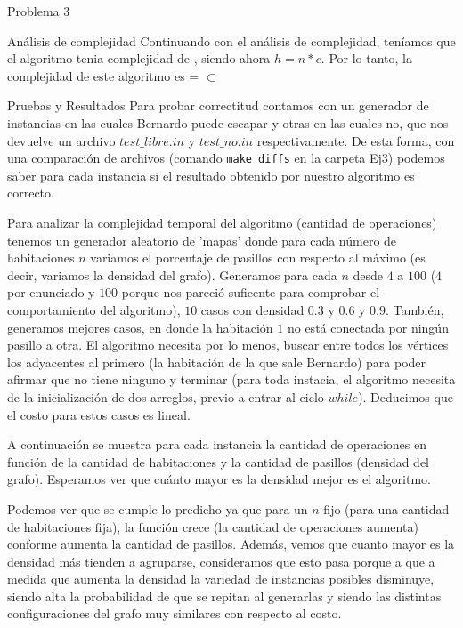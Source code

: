 \begin{section}{Problema 3}
\begin{subsection}{Análisis de complejidad}
		Continuando con el análisis de complejidad, teníamos que el algoritmo tenia complejidad de , siendo ahora $h=n*c$. Por lo tanto, la complejidad de este algoritmo es  =  $\subset$ \\
	\end{subsection}


	\begin{subsection}{Pruebas y Resultados}
		Para probar correctitud contamos con un generador de instancias en las cuales Bernardo puede escapar y otras en las cuales no, que nos devuelve un archivo $test\_libre.in$ y $test\_no.in$ respectivamente. De esta forma, con una comparación de archivos (comando \texttt{make diffs} en la carpeta Ej3) podemos saber para cada instancia si el resultado obtenido por nuestro algoritmo es correcto.

		Para analizar la complejidad temporal del algoritmo (cantidad de operaciones) tenemos un generador aleatorio de 'mapas' donde para cada número de habitaciones $n$ variamos el porcentaje de pasillos con respecto al máximo (es decir, variamos la densidad del grafo). Generamos para cada $n$ desde $4$ a $100$ ($4$ por enunciado y $100$ porque nos pareció suficente para comprobar el comportamiento del algoritmo), $10$ casos con densidad $0.3$ y $0.6$ y $0.9$. También, generamos mejores casos, en donde la habitación $1$ no está conectada por ningún pasillo a otra. El algoritmo necesita por lo menos, buscar entre todos los vértices los adyacentes al primero (la habitación de la que sale Bernardo) para poder afirmar que no tiene ninguno y terminar (para toda instacia, el algoritmo necesita de la inicialización de dos arreglos, previo a entrar al ciclo $while$). Deducimos que el costo para estos casos es lineal.

		A continuación se muestra para cada instancia la cantidad de operaciones en función de la cantidad de habitaciones y la cantidad de pasillos (densidad del grafo). Esperamos ver que cuánto mayor es la densidad mejor es el algoritmo.
		

		Podemos ver que se cumple lo predicho ya que para un $n$ fijo (para una cantidad de habitaciones fija), la función crece (la cantidad de operaciones aumenta) conforme aumenta la cantidad de pasillos. 
		Además, vemos que cuanto mayor es la densidad más tienden a agruparse, consideramos que esto pasa porque a que a medida que aumenta la densidad la variedad de instancias posibles disminuye, siendo alta la probabilidad de que se repitan al generarlas y siendo las distintas configuraciones del grafo muy similares con respecto al costo.\VSP


\end{subsection}
\end{section}
